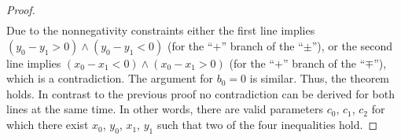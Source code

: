 \begin{proof}
\begin{align*}
\end{align*}
Due to  the nonnegativity constraints either the first line implies $(y_0 - y_1 > 0) \wedge (y_0 - y_1 < 0)$ (for the \enquote{$+$} branch of the \enquote{$\pm$}), or the second line implies $(x_0 - x_1 < 0) \wedge (x_0 - x_1 > 0)$ (for the \enquote{$+$} branch of the \enquote{$\mp$}), which is a contradiction. The argument for $b_0 = 0$ is similar. Thus, the theorem holds. In contrast to the previous proof no contradiction can be derived for both lines at the same time. In other words, there are valid parameters $c_0$, $c_1$, $c_2$ for which there exist $x_0$, $y_0$, $x_1$, $y_1$ such that two of the four inequalities hold.
\end{proof}


%
%
%
%
